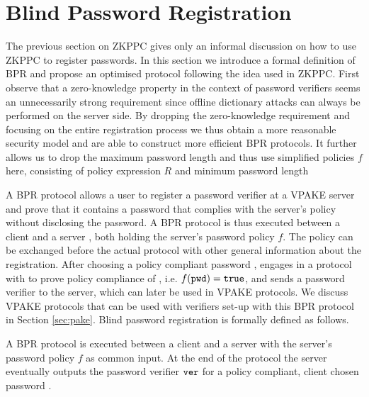 \section{Blind Password Registration} \label{sec:bpr}

The previous section on \ac{ZKPPC} gives only an informal discussion on how to use \ac{ZKPPC} to register passwords.
In this section we introduce a formal definition of \ac{BPR} and propose an optimised protocol following the idea used in \ac{ZKPPC}.
First observe that a zero-knowledge property in the context of password verifiers seems an unnecessarily strong requirement since offline dictionary attacks can always be performed on the server side.
By dropping the zero-knowledge requirement and focusing on the entire registration process we thus obtain a more reasonable security model and are able to construct more efficient \ac{BPR} protocols.
It further allows us to drop the maximum password length and thus use simplified policies $f$ here, consisting of policy expression $R$ and minimum password length \pmin

A \ac{BPR} protocol allows a user to register a password verifier at a \ac{VPAKE} server and prove that it contains a password that complies with the server's policy without disclosing the password.
A \ac{BPR} protocol is thus executed between a client \Client and a server \Server, both holding the server's password policy $f$.
The policy can be exchanged before the actual protocol with other general information about the registration.
After choosing a policy compliant password \pwd, \Client engages in a protocol with \Server to prove policy compliance of \pwd, i.e. $f(\mathtt{pwd})=\mathtt{true}$, and sends a password verifier to the server, which can later be used in \ac{VPAKE} protocols.
We discuss \ac{VPAKE} protocols that can be used with verifiers set-up with this \ac{BPR} protocol in Section \ref{sec:pake}.
Blind password registration is formally defined as follows.

\begin{definition}\label{def:bpr}
A \ac{BPR} protocol is executed between a client \Client and a server \Server with the server's password policy $f$ as common input. 
At the end of the protocol the server eventually outputs the password verifier $\mathtt{ver}$ for a policy compliant, client chosen password \pwd. %
\eod
\end{definition}


